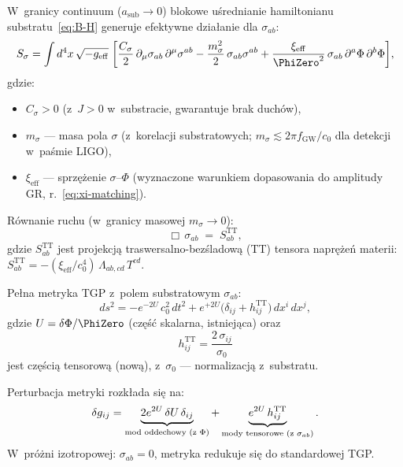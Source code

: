 \begin{proposition}\label{prop:sigma-eom}
W~granicy continuum ($a_{\mathrm{sub}} \to 0$)
blokowe u\'srednianie hamiltonianu substratu~\eqref{eq:B-H}
generuje efektywne dzia\l{}anie dla $\sigma_{ab}$:
\begin{equation}\label{eq:S-sigma}
  S_\sigma = \int d^4x\,\sqrt{-g_{\mathrm{eff}}}\;
  \biggl[
    \frac{C_\sigma}{2}\,\partial_\mu\sigma_{ab}\,\partial^\mu\sigma^{ab}
    - \frac{m_\sigma^2}{2}\,\sigma_{ab}\sigma^{ab}
    + \frac{\xi_{\mathrm{eff}}}{\PhiZero^2}\,
      \sigma_{ab}\,\partial^a\Phi\,\partial^b\Phi
  \biggr],
\end{equation}
gdzie:
\begin{itemize}[nosep]
  \item $C_\sigma > 0$ (z~$J > 0$ w~substracie,
    gwarantuje brak duch\'ow),
  \item $m_\sigma$ --- masa pola $\sigma$
    (z~korelacji substratowych; $m_\sigma \lesssim
    2\pi f_{\mathrm{GW}}/c_0$ dla detekcji w~pa\'smie LIGO),
  \item $\xi_{\mathrm{eff}}$ --- sprz\k{e}\.zenie
    $\sigma$--$\Phi$ (wyznaczone warunkiem dopasowania
    do amplitudy GR, r.~\eqref{eq:xi-matching}).
\end{itemize}
R\'ownanie ruchu (w~granicy masowej $m_\sigma \to 0$):
\begin{equation}\label{eq:box-sigma}
  \boxed{
    \Box\,\sigma_{ab}
    \;=\; S_{ab}^{\mathrm{TT}},
  }
\end{equation}
gdzie $S_{ab}^{\mathrm{TT}}$ jest projekcj\k{a}
traswersalno-bez\'sladow\k{a} (TT) tensora
napr\k{e}\.ze\'n materii:
$S_{ab}^{\mathrm{TT}}
= -(\xi_{\mathrm{eff}}/c_0^4)\,
\Lambda_{ab,cd}\,T^{cd}$.
\end{proposition}

\begin{proposition}%
\label{prop:metric-with-tensor}
Pe\l{}na metryka TGP z~polem substratowym $\sigma_{ab}$:
\begin{equation}\label{eq:metric-full-tensor}
  \boxed{
    ds^2 = -e^{-2U}\,c_0^2\,dt^2
    + e^{+2U}\bigl(\delta_{ij} + h_{ij}^{\mathrm{TT}}\bigr)
    \,dx^i\,dx^j,
  }
\end{equation}
gdzie $U = \delta\Phi/\PhiZero$ (cz\k{e}\'s\'c skalarna, istniej\k{a}ca)
oraz
\begin{equation}\label{eq:h-TT-from-sigma}
  h_{ij}^{\mathrm{TT}} = \frac{2\,\sigma_{ij}}{\sigma_0}
\end{equation}
jest cz\k{e}\'sci\k{a} tensorow\k{a} (now\k{a}),
z~$\sigma_0$ --- normalizacj\k{a} z~substratu.

Perturbacja metryki rozk\l{}ada si\k{e} na:
\begin{equation}
  \delta g_{ij} = \underbrace{2e^{2U}\,\delta U\,\delta_{ij}}_%
  {\text{mod oddechowy (z~$\Phi$)}}
  + \underbrace{e^{2U}\,h_{ij}^{\mathrm{TT}}}_%
  {\text{mody tensorowe (z~$\sigma_{ab}$)}}.
\end{equation}
W~pr\'o\.zni izotropowej: $\sigma_{ab} = 0$,
metryka redukuje si\k{e} do standardowej TGP.
\end{proposition}

